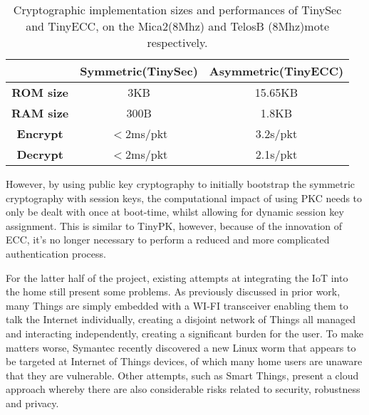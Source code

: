 \documentclass{mprop}
\begin{document}
\begin{table}[h] %
  \begin{center} 
  \begin{tabular}{|c|c|c|} 
  \hline
           & \textbf{Symmetric(TinySec)} & \textbf{Asymmetric(TinyECC)} \\ \hline
  \textbf{ROM size} & 3KB                & 15.65KB \\ \hline
  \textbf{RAM size} & 300B               & 1.8KB \\ \hline
  \textbf{Encrypt}  & $<$2ms/pkt         & 3.2s/pkt \\ \hline 
  \textbf{Decrypt}  & $<$2ms/pkt         & 2.1s/pkt \\ \hline
  \end{tabular}
  \caption[]{Cryptographic implementation sizes and performances of TinySec and TinyECC, on the Mica2(8Mhz) and TelosB (8Mhz)mote respectively\footnotemark. \cite{TinySec,TinyECC}}
  \label{tab:crypto_compare}
  \end{center}
\end{table}


However, by using public key cryptography to initially bootstrap the symmetric cryptography with session keys, the computational impact of using PKC needs to only be dealt with once at boot-time, whilst allowing for dynamic session key assignment. This is similar to TinyPK, however, because of the innovation of ECC, it's no longer necessary to perform a reduced and more complicated authentication process\cite{TinyPK}.

For the latter half of the project, existing attempts at integrating the IoT into the home still present some problems. As previously discussed in prior work\cite{KNoT}, many Things are simply embedded with a WI-FI transceiver enabling them to talk the Internet individually, creating a disjoint network of Things all managed and interacting independently, creating a significant burden for the user. To make matters worse, Symantec recently discovered a new Linux worm\cite{IoTWorm} that appears to be targeted at Internet of Things devices, of which many home users are unaware that they are vulnerable. Other attempts, such as Smart Things, present a cloud approach whereby there are also considerable risks related to security, robustness and privacy. 
\end{document}
